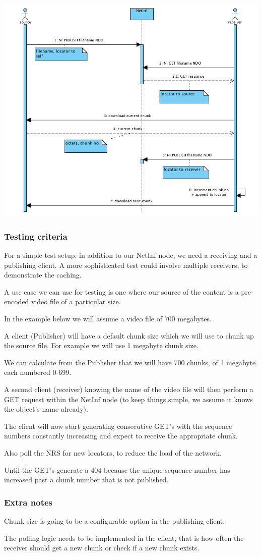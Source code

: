 \includegraphics[scale=0.5]{./img/sequence_diagram_streaming.png}

\subsubsection{Testing criteria} 

For a simple test setup, in addition to our NetInf node, we need a receiving and a publishing client. A more sophisticated test could involve multiple receivers, to demonstrate the caching.

A use case we can use for testing is one where our source of the content is a pre-encoded video file of a particular size.

In the example below we will assume a video file of 700 megabytes.

A client (Publisher) will have a default chunk size which we will use to chunk up the source file. For example we will use 1 megabyte chunk size.

We can calculate from the Publisher that we will have 700 chunks, of 1 megabyte each numbered 0-699. 

A second client (receiver) knowing the name of the video file will then perform a GET request within the NetInf node (to keep things simple, we assume it knows the object's name already).

The client will now start generating consecutive GET's with the sequence numbers constantly increasing and expect to receive the appropriate chunk.

Also poll the NRS for new locators, to reduce the load of the network.

Until the GET's generate a 404 because the unique sequence number has increased past a chunk number that is not published.

\subsubsection{Extra notes}

Chunk size is going to be a configurable option in the publishing client.

The polling logic needs to be implemented in the client, that is how often the receiver should get a new chunk or check if a new chunk exists.  